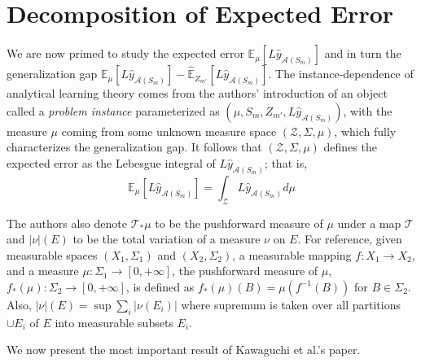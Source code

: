 \documentclass{article}
\begin{document}
\section{Decomposition of Expected Error}
We are now primed to study the expected error $\mathbb{E}_{\mu}[L \hat{y}_{\mathcal{A}(S_m)}]$ and in turn the generalization gap $\mathbb{E}_{\mu}[L \hat{y}_{\mathcal{A}(S_m)}] - \hat{\mathbb{E}}_{Z_{m'}}[L \hat{y}_{\mathcal{A}(S_m)}]$. The instance-dependence of analytical learning theory comes from the authors' introduction of an object called a \textit{problem instance} parameterized as $(\mu, S_m, Z_{m'}, L \hat{y}_{\mathcal{A}(S_m)})$, with the measure $\mu$ coming from some unknown measure space $(\mathcal{Z}, \Sigma, \mu)$, which fully characterizes the generalization gap. It follows that $(\mathcal{Z}, \Sigma, \mu)$ defines the expected error as the Lebesgue integral of $L \hat{y}_{\mathcal{A}(S_m)}$; that is,
\[\mathbb{E}_{\mu}[L \hat{y}_{\mathcal{A}(S_m)}] = \int_{\mathcal{Z}} L \hat{y}_{\mathcal{A}(S_m)} d\mu\]

The authors also denote $\mathcal{T}_{*} \mu$ to be the pushforward measure of $\mu$ under a map $\mathcal{T}$ and $|\nu| (E)$ to be the total variation of a measure $\nu$ on $E$. For reference, given measurable spaces $(X_1, \Sigma_1)$ and $(X_2, \Sigma_2)$, a measurable mapping $f: X_1 \rightarrow X_2$, and a measure $\mu: \Sigma_1 \rightarrow [0, +\infty]$, the pushforward measure of $\mu$, $f_{*}(\mu): \Sigma_2 \rightarrow [0, +\infty]$, is defined as $f_{*}(\mu)(B) = \mu(f^{-1}(B))$ for $B \in \Sigma_2$. Also, $|\nu|(E) = \sup \sum_{i} |\nu(E_i)|$ where supremum is taken over all partitions $\cup E_i$ of $E$ into measurable subsets $E_i$.

We now present the most important result of Kawaguchi et al.'s paper.
\end{document}
